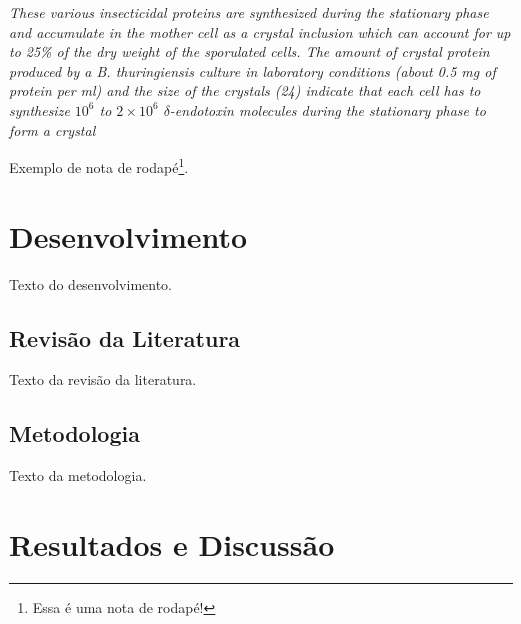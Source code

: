 \documentclass[
	article,			%
	11pt,				%
	oneside,			%
	a4paper,			%
	chapter=TITLE,		%
	section=TITLE,		%
	english,			%
	brazil,				%
	sumario=tradicional
]{abntex2}
\begin{document}
	\begin{citacao}
		\textit{These various insecticidal proteins are synthesized during the stationary phase and accumulate in the mother cell as a crystal inclusion which can account for up to 25\% of the dry weight of the sporulated cells. The amount of crystal protein produced by a B. thuringiensis culture in laboratory conditions (about 0.5 mg of protein per ml) and the size of the crystals (24) indicate that each cell has to synthesize $10^6$ to $2 \times 10^6$ $\delta$-endotoxin molecules during the stationary phase to form a crystal} \cite[p. 1]{Agaisse1995}
	\end{citacao}
	
	Exemplo de nota de rodapé\footnote{Essa é uma nota de rodapé!}.
	
    
    

	\section{Desenvolvimento}
    	
     Texto do desenvolvimento.
     
     
     
     
     \subsection{Revisão da Literatura}
     
     Texto da revisão da literatura.
     
     
     
     
     \subsection{Metodologia}
     
     Texto da metodologia.
     
     
     
     
     

	\section{Resultados e Discussão}
    	
\end{document}
